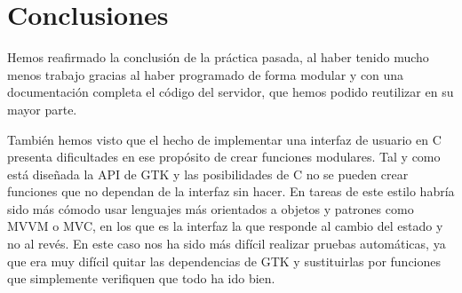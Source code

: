 \documentclass{article}
\begin{document}
\section{Conclusiones}

Hemos reafirmado la conclusión de la práctica pasada, al haber tenido mucho menos trabajo gracias al haber programado de forma modular y con una documentación completa el código del servidor, que hemos podido reutilizar en su mayor parte.

También hemos visto que el hecho de implementar una interfaz de usuario en C presenta dificultades en ese propósito de crear funciones modulares. Tal y como está diseñada la API de GTK y las posibilidades de C no se pueden crear funciones que no dependan de la interfaz sin hacer. En tareas de este estilo habría sido más cómodo usar lenguajes más orientados a objetos y patrones como MVVM o MVC, en los que es la interfaz la que responde al cambio del estado y no al revés. En este caso nos ha sido más difícil realizar pruebas automáticas, ya que era muy difícil quitar las dependencias de GTK y sustituirlas por funciones que simplemente verifiquen que todo ha ido bien. 
\end{document}
